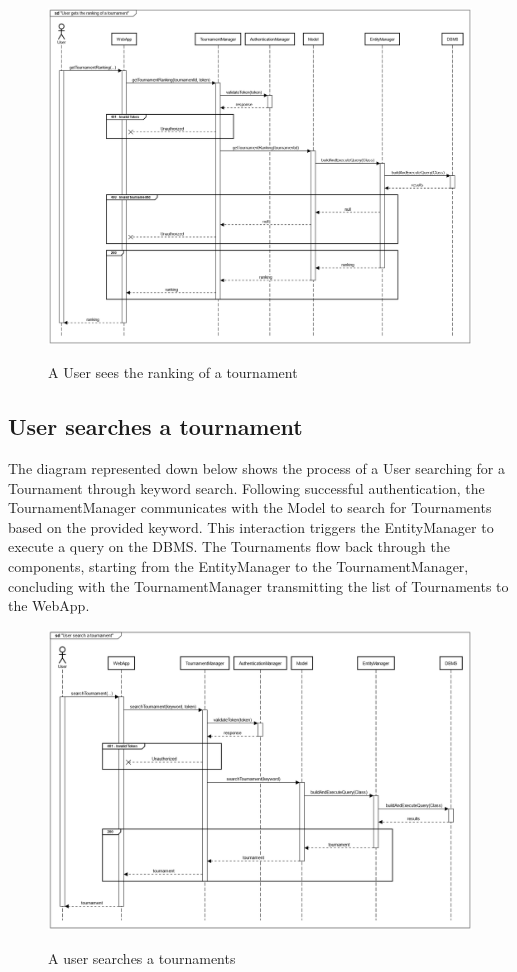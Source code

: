 \documentclass{Configuration_Files/Template}
\begin{document}
\begin{figure}[H]
\centering
\includegraphics[scale = 0.33]{Images/diagrams/sequences/GetTournamentRanking.png}\\
\caption{A User sees the ranking of a tournament}
\end{figure}

\subsection*{User searches a tournament}

The diagram represented down below shows the process of a User searching for a Tournament through keyword search. Following successful authentication, the TournamentManager communicates with the Model to search for Tournaments based on the provided keyword. This interaction triggers the EntityManager to execute a query on the DBMS. The Tournaments flow back through the components, starting from the EntityManager to the TournamentManager, concluding with the TournamentManager transmitting the list of Tournaments to the WebApp.

\begin{figure}[H]
\centering
\includegraphics[scale = 0.33]{Images/diagrams/sequences/searchTournament.png}\\
\caption{A user searches a tournaments }
\end{figure}
\end{document}
